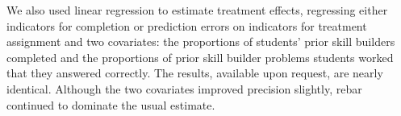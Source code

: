 \documentclass{edm_template}
\newcommand{\model}{\hat{y}_0(\cdot)}
\begin{document}
We also used linear regression to estimate treatment effects, regressing either indicators for completion or prediction errors on indicators for treatment assignment and two covariates: the proportions of students' prior skill builders completed and the proportions of prior skill builder problems students worked that they answered correctly. 
The results, available upon request, are nearly identical.
Although the two covariates improved precision slightly, rebar continued to dominate the usual estimate. 

\end{document}
